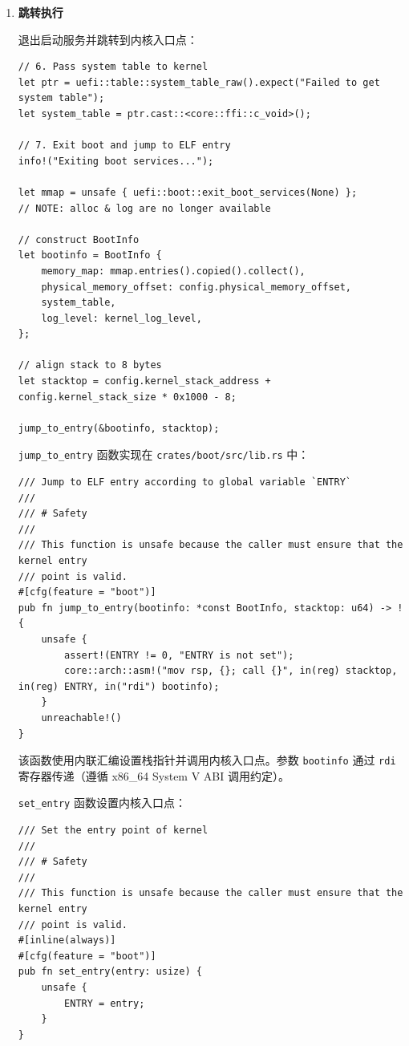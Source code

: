 \documentclass{SYSUReport}
\begin{document}
\begin{enumerate}[label={\chinese*、},labelsep=0pt, start=2]
    \texttt{max\_phys\_addr} 通过遍历内存映射表，计算每个内存区域的结束地址（起始地址 + 页数 $\times$ 4KB），取最大值。同时与 \texttt{0x1\_0000\_0000}（4GB）取最大值，确保包含 IOAPIC 的 MMIO 区域（通常位于 4GB 附近）。

    \item \textbf{跳转执行}

    退出启动服务并跳转到内核入口点：

    \begin{verbatim}
// 6. Pass system table to kernel
let ptr = uefi::table::system_table_raw().expect("Failed to get system table");
let system_table = ptr.cast::<core::ffi::c_void>();

// 7. Exit boot and jump to ELF entry
info!("Exiting boot services...");

let mmap = unsafe { uefi::boot::exit_boot_services(None) };
// NOTE: alloc & log are no longer available

// construct BootInfo
let bootinfo = BootInfo {
    memory_map: mmap.entries().copied().collect(),
    physical_memory_offset: config.physical_memory_offset,
    system_table,
    log_level: kernel_log_level,
};

// align stack to 8 bytes
let stacktop = config.kernel_stack_address + config.kernel_stack_size * 0x1000 - 8;

jump_to_entry(&bootinfo, stacktop);
    \end{verbatim}

    \texttt{jump\_to\_entry} 函数实现在 \texttt{crates/boot/src/lib.rs} 中：

    \begin{verbatim}
/// Jump to ELF entry according to global variable `ENTRY`
///
/// # Safety
///
/// This function is unsafe because the caller must ensure that the kernel entry
/// point is valid.
#[cfg(feature = "boot")]
pub fn jump_to_entry(bootinfo: *const BootInfo, stacktop: u64) -> ! {
    unsafe {
        assert!(ENTRY != 0, "ENTRY is not set");
        core::arch::asm!("mov rsp, {}; call {}", in(reg) stacktop, in(reg) ENTRY, in("rdi") bootinfo);
    }
    unreachable!()
}
    \end{verbatim}

    该函数使用内联汇编设置栈指针并调用内核入口点。参数 \texttt{bootinfo} 通过 \texttt{rdi} 寄存器传递（遵循 x86\_64 System V ABI 调用约定）。

    \texttt{set\_entry} 函数设置内核入口点：

    \begin{verbatim}
/// Set the entry point of kernel
///
/// # Safety
///
/// This function is unsafe because the caller must ensure that the kernel entry
/// point is valid.
#[inline(always)]
#[cfg(feature = "boot")]
pub fn set_entry(entry: usize) {
    unsafe {
        ENTRY = entry;
    }
}
    \end{verbatim}


\end{enumerate}
\end{document}
